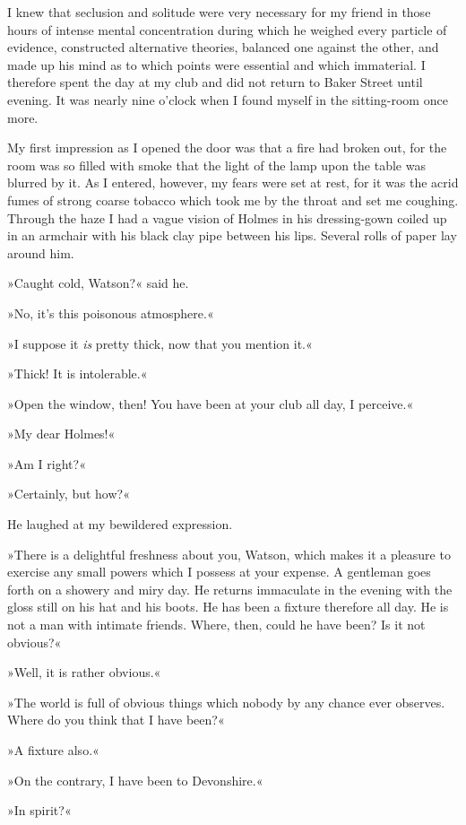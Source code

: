 I knew that seclusion and solitude were very necessary for my friend in those hours of intense mental concentration during which he weighed every particle of evidence, constructed alternative theories, balanced one against the other, and made up his mind as to which points were essential and which immaterial. I therefore spent the day at my club and did not return to Baker Street until evening. It was nearly nine o'clock when I found myself in the sitting-room once more.

My first impression as I opened the door was that a fire had broken out, for the room was so filled with smoke that the light of the lamp upon the table was blurred by it. As I entered, however, my fears were set at rest, for it was the acrid fumes of strong coarse tobacco which took me by the throat and set me coughing. Through the haze I had a vague vision of Holmes in his dressing-gown coiled up in an armchair with his black clay pipe between his lips. Several rolls of paper lay around him.

»Caught cold, Watson?« said he.

»No, it's this poisonous atmosphere.«

»I suppose it \emph{is} pretty thick, now that you mention it.«

»Thick! It is intolerable.«

»Open the window, then! You have been at your club all day, I perceive.«

»My dear Holmes!«

»Am I right?«

»Certainly, but how?«

He laughed at my bewildered expression.

»There is a delightful freshness about you, Watson, which makes it a pleasure to exercise any small powers which I possess at your expense. A gentleman goes forth on a showery and miry day. He returns immaculate in the evening with the gloss still on his hat and his boots. He has been a fixture therefore all day. He is not a man with intimate friends. Where, then, could he have been? Is it not obvious?«

»Well, it is rather obvious.«

»The world is full of obvious things which nobody by any chance ever observes. Where do you think that I have been?«

»A fixture also.«

»On the contrary, I have been to Devonshire.«

»In spirit?«

